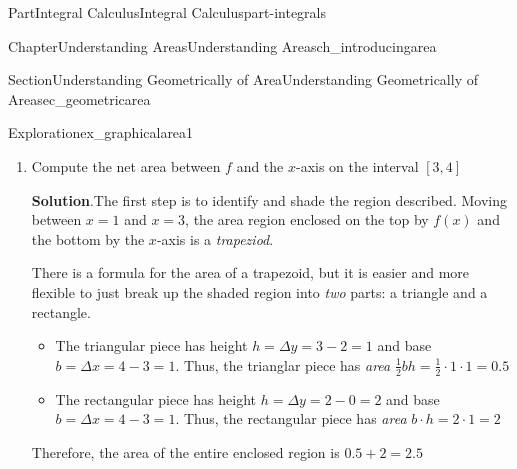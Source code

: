 \documentclass{tufte-book}
\newcommand{\blocktitlefont}{\relax}
\numberwithin{equation}{chapter}
\begin{document}
\begin{partptx}{Part}{Integral Calculus}{}{Integral Calculus}{}{}{part-integrals}
\begin{chapterptx}{Chapter}{Understanding Areas}{}{Understanding Areas}{}{}{ch_introducingarea}
\begin{sectionptx}{Section}{Understanding Geometrically of Area}{}{Understanding Geometrically of Area}{}{}{sec_geometricarea}
\begin{exploration}{Exploration}{}{ex_graphicalarea1}
\begin{enumerate}[font=\bfseries,label=(\alph*),ref=\alph*]
\begin{image}{0.25}{0.5}{0.25}{}
{
}%
\end{image}%
\item{}Compute the net area between \(f\) and the \(x\)-axis on the interval \([3,4]\)%
\par\smallskip%
\noindent\textbf{\blocktitlefont Solution}.\hypertarget{ex_graphicalarea1-4-2}{}\quad{}The first step is to identify and shade the region described. Moving between \(x=1\) and \(x=3\), the area region enclosed on the top by \(f(x)\) and the bottom by the \(x\)-axis is a \emph{trapeziod}.%
\par
There is a formula for the area of a trapezoid, but it is easier and more flexible to just break up the shaded region into \emph{two} parts: a triangle and a rectangle.%
\begin{itemize}[label=\textbullet]
\item{}The triangular piece has height \(h=\Delta y = 3-2=1\) and base \(b=\Delta x = 4-3=1\). Thus, the trianglar piece has \emph{area} \(\frac{1}{2} b h = \frac{1}{2} \cdot 1\cdot 1 = 0.5 \)%
\item{}The rectangular piece has height \(h=\Delta y = 2-0=2\) and base \(b=\Delta x = 4-3=1\). Thus, the rectangular piece has \emph{area} \(b\cdot h= 2 \cdot 1 = 2\)%
\end{itemize}
Therefore, the area of the entire enclosed region is \(0.5 + 2 = 2.5\)%
\begin{image}{0.25}{0.5}{0.25}{}%
\end{image}
\end{enumerate}
\end{exploration}
\end{sectionptx}
\end{chapterptx}
\end{partptx}
\end{document}
